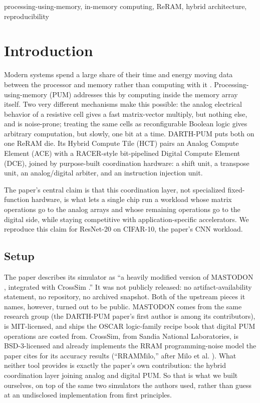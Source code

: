 \documentclass[conference]{IEEEtran}
\begin{document}
\begin{IEEEkeywords}
processing-using-memory, in-memory computing, ReRAM, hybrid architecture, reproducibility
\end{IEEEkeywords}

\section{Introduction}

Modern systems spend a large share of their time and energy moving data
between the processor and memory rather than computing with it
\cite{darthpum}. Processing-using-memory (PUM) addresses this by computing
inside the memory array itself. Two very different mechanisms make this
possible: the analog electrical behavior of a resistive cell gives a fast
matrix-vector multiply, but nothing else, and is noise-prone; treating the
same cells as reconfigurable Boolean logic gives arbitrary computation, but
slowly, one bit at a time. DARTH-PUM \cite{darthpum} puts both on one ReRAM
die. Its Hybrid Compute Tile (HCT) pairs an Analog Compute Element (ACE)
with a RACER-style \cite{racer} bit-pipelined Digital Compute Element (DCE),
joined by purpose-built coordination hardware: a shift unit, a transpose
unit, an analog/digital arbiter, and an instruction injection unit.

The paper's central claim is that this coordination layer, not
specialized fixed-function hardware, is what lets a single chip run a
workload whose matrix operations go to the analog arrays and whose
remaining operations go to the digital side, while staying competitive with
application-specific accelerators. We reproduce this claim for ResNet-20 on
CIFAR-10, the paper's CNN workload.

\subsection{Setup}

The paper describes its simulator as ``a heavily modified version of
MASTODON \cite{mastodon}, integrated with CrossSim \cite{crosssim}.'' It was
not publicly released: no artifact-availability statement, no repository,
no archived snapshot. Both of the upstream pieces it names, however, turned
out to be public. MASTODON comes from the same research group (the
DARTH-PUM paper's first author is among its contributors), is MIT-licensed,
and ships the OSCAR \cite{oscar} logic-family recipe book that digital PUM
operations are costed from. CrossSim, from Sandia National Laboratories, is
BSD-3-licensed and already implements the RRAM programming-noise model the
paper cites for its accuracy results (``RRAMMilo,'' after Milo et al.
\cite{milo}). What neither tool provides is exactly the paper's own
contribution: the hybrid coordination layer joining analog and digital PUM.
So that is what we built ourselves, on top of the same two simulators the
authors used, rather than guess at an undisclosed implementation from first
principles.
\end{document}
